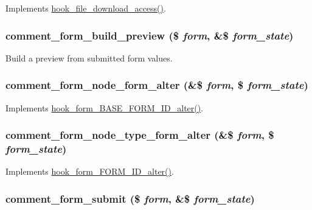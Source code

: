 \label{comment_8module_a5632b449cf518ee83511f74ac061c644}
Implements \hyperlink{file_8api_8php_ae72c8feceec1072762bffc3ba020aa2a}{hook\_\-file\_\-download\_\-access()}. \hypertarget{comment_8module_a70a0f5820c8a9e01dec5112b716a9062}{
\subsubsection[{comment\_\-form\_\-build\_\-preview}]{\setlength{\rightskip}{0pt plus 5cm}comment\_\-form\_\-build\_\-preview (\$ {\em form}, \/  \&\$ {\em form\_\-state})}}
\label{comment_8module_a70a0f5820c8a9e01dec5112b716a9062}
Build a preview from submitted form values. \hypertarget{comment_8module_ab319853b494144007980b7e728ea09f2}{
\subsubsection[{comment\_\-form\_\-node\_\-form\_\-alter}]{\setlength{\rightskip}{0pt plus 5cm}comment\_\-form\_\-node\_\-form\_\-alter (\&\$ {\em form}, \/  \$ {\em form\_\-state})}}
\label{comment_8module_ab319853b494144007980b7e728ea09f2}
Implements \hyperlink{group__hooks_gaf0cfc224a88c8823da68856c30a4841a}{hook\_\-form\_\-BASE\_\-FORM\_\-ID\_\-alter()}. \hypertarget{comment_8module_a81daa60b30cc06df7a8d08d075eb77eb}{
\subsubsection[{comment\_\-form\_\-node\_\-type\_\-form\_\-alter}]{\setlength{\rightskip}{0pt plus 5cm}comment\_\-form\_\-node\_\-type\_\-form\_\-alter (\&\$ {\em form}, \/  \$ {\em form\_\-state})}}
\label{comment_8module_a81daa60b30cc06df7a8d08d075eb77eb}
Implements \hyperlink{group__hooks_ga8d4a4089551493d55911bd5c4f218264}{hook\_\-form\_\-FORM\_\-ID\_\-alter()}. \hypertarget{comment_8module_abb91789dc7f908120219fc645e7e1612}{
\subsubsection[{comment\_\-form\_\-submit}]{\setlength{\rightskip}{0pt plus 5cm}comment\_\-form\_\-submit (\$ {\em form}, \/  \&\$ {\em form\_\-state})}}
